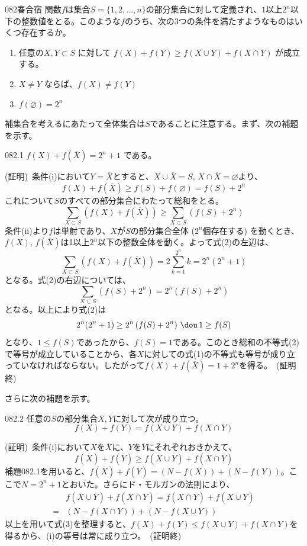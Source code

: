 \begin{prob}{082}{}{春合宿}
 関数$f$は集合$S=\{1, 2, \dots, n\}$の部分集合に対して定義され、$1$以上$2^n$以下の整数値をとる。このような$f$のうち、次の3つの条件を満たすようなものはいくつ存在するか。
 \begin{enumerate}
  \renewcommand{\labelenumi}{\arabic{enumi}.}
  \item 任意の$X, Y \subset S$ に対して $f(X)+f(Y) \ge f(X\cup Y)+f(X\cap Y)$ が成立する。
  \item $X \neq Y$ ならば、$f(X)\neq f(Y)$
  \item $f(\varnothing)=2^n$
 \end{enumerate}
\end{prob}
補集合を考えるにあたって全体集合は$S$であることに注意する。まず、次の補題を示す。
\begin{subthm}{082.1}
 $f(X)+f(\overline{X})=2^n+1$ である。
\end{subthm}

(証明)~条件(i)において$Y=\overline{X}$とすると、$X\cup\overline{X}=S$, $X\cap\overline{X}=\varnothing$より、
\[ f(X)+f(\overline{X})\ge f(S)+f(\varnothing)=f(S)+2^n \tag{1} \]
これについて$S$のすべての部分集合にわたって総和をとる。
\[ \sum_{X\subset S}\left(f(X)+f(\overline{X})\right)\ge\sum_{X\subset S} \left(f(S)+2^n\right) \tag{2} \]
条件(ii)より$f$は単射であり、$X$が$S$の部分集合全体 ($2^n$個存在する) を動くとき、$f(X)$, $f(\overline{X})$は1以上$2^n$以下の整数全体を動く。よって式(2)の左辺は、
\[ \sum_{X\subset S}\left(f(X)+f(\overline{X})\right)=2\sum_{k=1}^{2^n}k = 2^n(2^n+1) \]
となる。式(2)の右辺については、
\[ \sum_{X\subset S}\left(f(S)+2^n\right) = 2^n\left(f(S)+2^n\right) \]
となる。以上により式(2)は
\[ 2^n(2^n+1) \ge 2^n\left(f(S)+2^n \right) \,\dou\, 1\ge f(S) \]
となり、$1\le f(S)$であったから、$f(S)=1$である。このとき総和の不等式(2)で等号が成立していることから、各$X$に対しての式(1)の不等式も等号が成り立っていなければならない。したがって$f(X)+f(\overline{X})=1+2^n$を得る。~(証明終)

さらに次の補題を示す。
\begin{subthm}{082.2}
 任意の$S$の部分集合$X, Y$に対して次が成り立つ。
 \[ f(X)+f(Y)=f(X\cup Y)+f(X\cap Y)  \]
\end{subthm}
(証明)~条件(i)において$X$を$\overline{X}$に、$Y$を$\overline{Y}$にそれぞれおきかえて、
\[ f(\overline{X})+f(\overline{Y})\ge f(\overline{X}\cup\overline{Y})+f(\overline{X}\cap\overline{Y}) \tag{3} \]
補題082.1を用いると、$f(\overline{X})+f(\overline{Y})=(N-f(X))+(N-f(Y))$。ここで$N=2^n+1$とおいた。さらにド・モルガンの法則により、
\begin{align*}
 &f(\overline{X}\cup\overline{Y})+f(\overline{X}\cap\overline{Y})=f(\overline{X\cap Y})+f(\overline{X\cup Y}) \\
 =&(N-f(X\cap Y))+(N-f(X\cup Y))
\end{align*}
以上を用いて式(3)を整理すると、$f(X)+f(Y)\le f(X\cup Y)+f(X\cap Y)$を得るから、(i)の等号は常に成り立つ。~(証明終)

